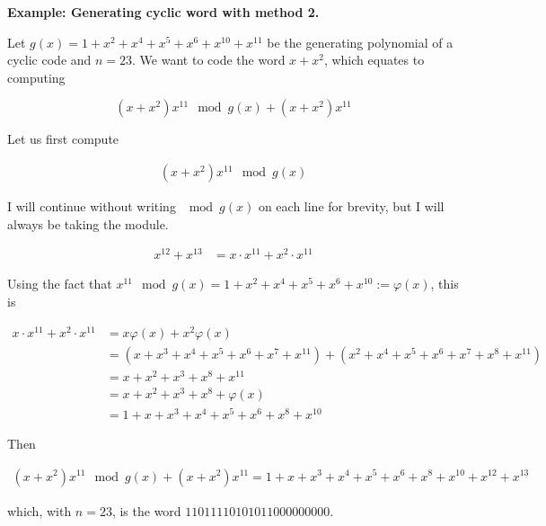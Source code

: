 \documentclass[a4paper]{article}
\begin{document}
\textbf{Example: Generating cyclic word with method 2.} 

Let $g(x)= 1 + x^2 + x^4 + x^5 + x^6  +  x^{10}  +  x^{11}$  be  the  generating
polynomial of a cyclic code and $n = 23$. We want to code the word $x + x^2$,
which equates to computing 

$$
(x+x^2)x^{11} \mod g(x) + (x+x^2)x^{11}
$$

Let us first compute

\begin{align*}
(x+x^2)x^{11} \mod g(x)
\end{align*}

I will continue without writing $\mod g(x) $ on each line for brevity, but I
will always be taking the module.

\begin{align}
x^{12} + x^{13} &= x \cdot x^{11} + x^2 \cdot x^{11}
\end{align}

Using the fact that $x^{11} \mod g(x) = 1 + x^2 + x^4 + x^5 + x^6 + x^{10} := \varphi(x)$, this is 

\begin{align}
    x \cdot x^{11} + x^2 \cdot x^{11} &= x\varphi(x) + x^2\varphi(x) \\ 
    &= (x + x^3 + x^4 + x^5 + x^6 + x^7 + x^{11}) + (x^2 + x^4 + x^5 + x^6+x^7+x^8+x^{11}) \\ 
    &=x + x^2 + x^3 +x^8 + x^{11}  \\ 
    &= x + x^2 + x^3 + x^8 + \varphi(x) \\ 
    &= 1 + x + x^3 + x^4 + x^5 + x^6 + x^8 + x^{10}
\end{align}

Then

\begin{align*}
    (x+x^2)x^{11} \mod g(x) + (x+x^2)x^{11} = 1 + x + x^3 + x^4 + x^5 + x^6 + x^8 + x^{10} + x^{12} + x^{13}
\end{align*}

which, with $n = 23$, is the word $11011110101011000000000$.

\pagebreak 
\end{document}
